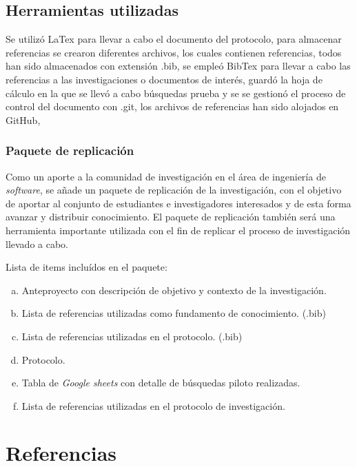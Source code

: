 \documentclass{article}
\begin{document}
\subsection{Herramientas utilizadas}
Se utilizó LaTex para llevar a cabo el documento del protocolo, para almacenar referencias 
se crearon diferentes archivos, los cuales contienen referencias, todos han sido 
almacenados con extensión .bib, se empleó BibTex para llevar a cabo las referencias a las 
investigaciones o documentos de interés, guardó la hoja de cálculo en la que se llevó 
a cabo búsquedas prueba y se se gestionó el proceso de control del documento con .git,
los archivos de referencias han sido alojados en GitHub,
\newpage

\subsubsection{Paquete de replicación}
Como un aporte a la comunidad de investigación en el área de ingeniería de \emph{software}, 
se añade un paquete de replicación de la investigación, con el objetivo de aportar  
al conjunto de estudiantes e investigadores interesados y de esta forma avanzar y distribuir 
conocimiento.
El paquete de replicación también será una herramienta importante utilizada con el fin de replicar 
el proceso de investigación llevado a cabo.

Lista de items incluídos en el paquete: 
  \begin{enumerate}[(a)]
  \item Anteproyecto con descripción de objetivo y contexto de la investigación. 
  \item Lista de referencias utilizadas como fundamento de conocimiento. (.bib)
  \item Lista de referencias utilizadas en el protocolo.  (.bib)
  \item Protocolo.
  \item Tabla de \emph{Google sheets} con detalle de búsquedas piloto realizadas. 
  \item Lista de referencias utilizadas en el protocolo de investigación.
  \end{enumerate}
\newpage

\section{Referencias}
\printbibliography
\end{document}

